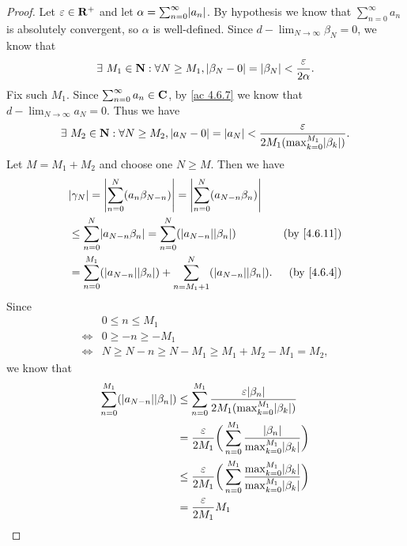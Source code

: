 \begin{proof}
  Let \(\varepsilon \in \mathbf{R}^+\) and let \(\alpha = \sum_{n = 0}^\infty \abs{a_n}\).
  By hypothesis we know that \(\sum_{n = 0}^\infty a_n\) is absolutely convergent, so \(\alpha\) is well-defined.
  Since \(d - \lim_{N \to \infty} \beta_N = 0\), we know that
  \[
    \exists\ M_1 \in \mathbf{N} : \forall N \geq M_1, \left\lvert\beta_N - 0\right\rvert = \left\lvert\beta_N\right\rvert < \frac{\varepsilon}{2 \alpha}.
  \]
  Fix such \(M_1\).
  Since \(\sum_{n = 0}^\infty a_n \in \mathbf{C}\), by \cref{ac 4.6.7} we know that \(d - \lim_{N \to \infty} a_N = 0\).
  Thus we have
  \[
    \exists\ M_2 \in \N : \forall N \geq M_2, \abs{a_N - 0} = \abs{a_N} < \frac{\varepsilon}{2 M_1 (\max_{k = 0}^{M_1} \abs{\beta_k})}.
  \]
  Let \(M = M_1 + M_2\) and choose one \(N \geq M\).
  Then we have
  \begin{align*}
     & \abs{\gamma_N} = \abs{\sum_{n = 0}^N (a_n \beta_{N - n})} = \abs{\sum_{n = 0}^N (a_{N - n} \beta_n)}                                     \\
     & \leq \sum_{n = 0}^N \abs{a_{N - n} \beta_n} = \sum_{n = 0}^N (\abs{a_{N - n}} \abs{\beta_n})                 & \text{(by \cref{4.6.11})} \\
     & = \sum_{n = 0}^{M_1} (\abs{a_{N - n}} \abs{\beta_n}) + \sum_{n = M_1 + 1}^N (\abs{a_{N - n}} \abs{\beta_n}). & \text{(by \cref{4.6.4})}
  \end{align*}
  Since
  \begin{align*}
         & 0 \leq n \leq M_1                                     \\
    \iff & 0 \geq -n \geq -M_1                                   \\
    \iff & N \geq N - n \geq N - M_1 \geq M_1 + M_2 - M_1 = M_2,
  \end{align*}
  we know that
  \begin{align*}
    \sum_{n = 0}^{M_1} (\abs{a_{N - n}} \abs{\beta_n}) & \leq \sum_{n = 0}^{M_1} \frac{\varepsilon \abs{\beta_n}}{2 M_1 (\max_{k = 0}^{M_1} \abs{\beta_k})}                                      \\
                                                       & = \frac{\varepsilon}{2 M_1} \bigg(\sum_{n = 0}^{M_1} \frac{\abs{\beta_n}}{\max_{k = 0}^{M_1} \abs{\beta_k}}\bigg)                       \\
                                                       & \leq \frac{\varepsilon}{2 M_1} \bigg(\sum_{n = 0}^{M_1} \frac{\max_{k = 0}^{M_1} \abs{\beta_k}}{\max_{k = 0}^{M_1} \abs{\beta_k}}\bigg) \\
                                                       & = \frac{\varepsilon}{2 M_1} M_1                                                                                                         \\

\end{align*}
\end{proof}
